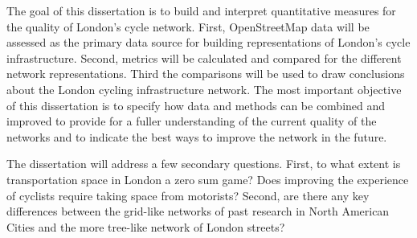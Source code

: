 The goal of this dissertation is to build and interpret quantitative measures for the quality of London's cycle network. First, OpenStreetMap data will be assessed as the primary data source for building representations of London's cycle infrastructure. Second, metrics will be calculated and compared for the different network representations. Third the comparisons will be used to draw conclusions about the London cycling infrastructure network. The most important objective of this dissertation is to specify how data and methods can be combined and improved to provide for a fuller understanding of the current quality of the networks and to indicate the best ways to improve the network in the future. 

The dissertation will address a few secondary questions. First, to what extent is transportation space in London a zero sum game? Does improving the experience of cyclists require taking space from motorists? Second, are there any key differences between the grid-like networks of past research in North American Cities and the more tree-like network of London streets? 

%
%
%
%

